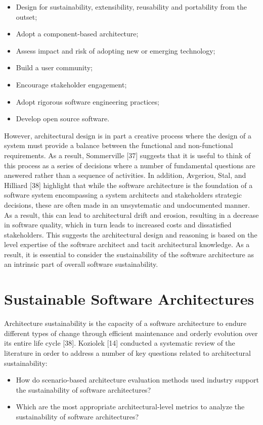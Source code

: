 \documentclass[preprint,12pt,authoryear]{elsarticle}
\begin{document}
\begin{itemize}
\item Design for sustainability, extensibility, reusability and
portability from the outset;
\item Adopt a component-based architecture;
\item Assess impact and risk of adopting new or emerging technology;
\item Build a user community;
\item Encourage stakeholder engagement;
\item Adopt rigorous software engineering practices;
\item Develop open source software.
\end{itemize}

However, architectural design is in part a creative process where the
design of a system must provide a balance between the functional and
non-functional requirements. As a result, Sommerville [37] suggests
that it is useful to think of this process as a series of decisions
where a number of fundamental questions are answered rather than a
sequence of activities. In addition, Avgeriou, Stal, and Hilliard [38]
highlight that while the software architecture is the foundation of a
software system encompassing a system architects and stakeholders
strategic decisions, these are often made in an unsystematic and
undocumented manner. As a result, this can lead to architectural drift
and erosion, resulting in a decrease in software quality, which in
turn leads to increased costs and dissatisfied stakeholders. This
suggests the architectural design and reasoning is based on the level
expertise of the software architect and tacit architectural
knowledge. As a result, it is essential to consider the sustainability
of the software architecture as an intrinsic part of overall software
sustainability.


\section{Sustainable Software Architectures}\label{sustsoftarch}

Architecture sustainability is the capacity of a software architecture
to endure different types of change through efficient maintenance and
orderly evolution over its entire life cycle [38]. Koziolek [14]
conducted a systematic review of the literature in order to address a
number of key questions related to architectural sustainability:

\begin{itemize}
\item How do scenario-based architecture evaluation methods used
industry support the sustainability of software architectures?
\item Which are the most appropriate architectural-level metrics to
analyze the sustainability of software architectures?
\end{itemize}
\end{document}
